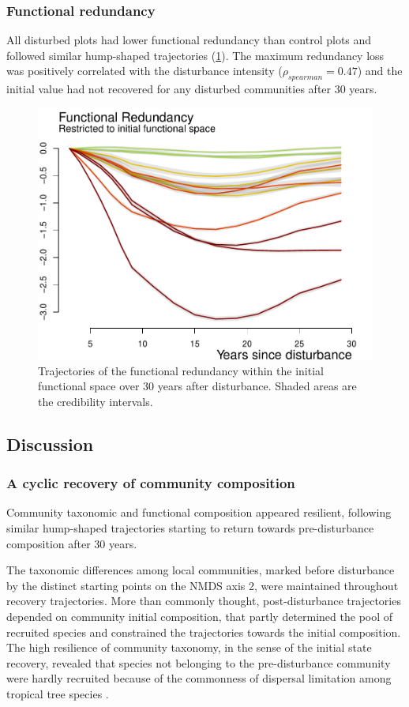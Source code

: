 \documentclass[
  11pt,
  french,
  A4paper,
  extrafontsizes,onecolumn,openright
  ]{memoir}
\begin{document}
\subsubsection{Functional redundancy}\label{functional-redundancy}

All disturbed plots had lower functional redundancy than control plots
and followed similar hump-shaped trajectories (\ref{fig:RedFunRest}).
The maximum redundancy loss was positively correlated with the
disturbance intensity (\(\rho_{spearman}=0.47\)) and the initial value
had not recovered for any disturbed communities after 30 years.

\begin{figure}

{\centering \includegraphics[width=0.6\linewidth]{Manuscript_files/figure-latex/RedFunRest-1} 

}

\caption{Trajectories of the functional redundancy within the initial functional space over 30 years after disturbance. Shaded areas are the credibility intervals.}\label{fig:RedFunRest}
\end{figure}

\subsection{Discussion}\label{discussion-1}

\subsubsection{A cyclic recovery of community
composition}\label{a-cyclic-recovery-of-community-composition}

Community taxonomic and functional composition appeared resilient,
following similar hump-shaped trajectories starting to return towards
pre-disturbance composition after 30 years.

The taxonomic differences among local communities, marked before
disturbance by the distinct starting points on the NMDS axis 2, were
maintained throughout recovery trajectories. More than commonly thought,
post-disturbance trajectories depended on community initial composition,
that partly determined the pool of recruited species and constrained the
trajectories towards the initial composition. The high resilience of
community taxonomy, in the sense of the initial state recovery, revealed
that species not belonging to the pre-disturbance community were hardly
recruited because of the commonness of dispersal limitation among
tropical tree species \autocite{Svenning2005}.
\end{document}
